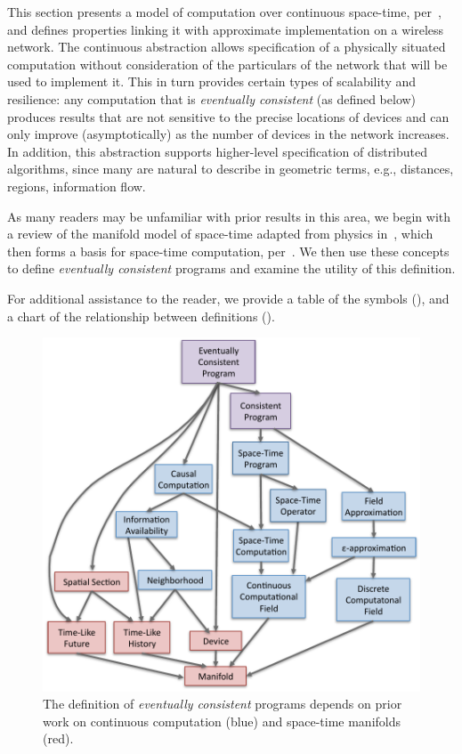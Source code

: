 \documentclass[12pt,a4paper,twoside,openright]{book}
\begin{document}
This section presents a model of computation over continuous space-time, per~\cite{bealBasisSCW10,BVD-SCW14,BealUsbeck12},  and defines properties linking it with approximate implementation on a wireless network.
%
The continuous abstraction allows specification of a physically situated computation without consideration of the particulars of the network that will be used to implement it.
%
This in turn provides certain types of scalability and resilience: any computation that is {\em eventually consistent} (as defined below) produces results that are not sensitive to the precise locations of devices and can only improve (asymptotically) as the number of devices in the network increases.
%
In addition, this abstraction supports higher-level specification of distributed algorithms, since many are natural to describe in geometric terms, e.g., distances, regions, information flow.

As many readers may be unfamiliar with prior results in this area, we begin with a review of the manifold model of space-time adapted from physics in~\cite{upp,bealBasisSCW10}, which then forms a basis for space-time computation, per~\cite{bealBasisSCW10,BVD-SCW14,BealUsbeck12}.
%
We then use these concepts to define {\em eventually consistent} programs and examine the utility of this definition.

For additional assistance to the reader, we provide a table of the symbols (), and a chart of the relationship between definitions ().

\begin{figure}
\centering
\includegraphics[width=0.8\columnwidth]{img/definitions}
\caption[Continuous computation and space-time manifolds]{The definition of {\em eventually consistent} programs depends on prior work on continuous computation (blue) and space-time manifolds (red).}
\label{f:definitions}
\end{figure}
\end{document}
